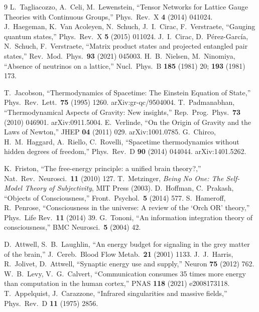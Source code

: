\documentclass[12pt,a4paper,twoside]{article}
\theoremstyle{plain}
\theoremstyle{definition}
\theoremstyle{remark}
\begin{document}
\begin{thebibliography}{9}
L.~Tagliacozzo, A.~Celi, M.~Lewenstein, ``Tensor Networks for Lattice Gauge Theories with Continuous Groups,'' Phys.\ Rev.\ X \textbf{4} (2014) 041024.
J.~Haegeman, K.~Van Acoleyen, N.~Schuch, J.~I.~Cirac, F.~Verstraete, ``Gauging quantum states,'' Phys.\ Rev.\ X \textbf{5} (2015) 011024.
J.~I.~Cirac, D.~P\'erez-Garc\'ia, N.~Schuch, F.~Verstraete, ``Matrix product states and projected entangled pair states,'' Rev.\ Mod.\ Phys.\ \textbf{93} (2021) 045003.
H.~B.~Nielsen, M.~Ninomiya, ``Absence of neutrinos on a lattice,'' Nucl.\ Phys.\ B \textbf{185} (1981) 20; \textbf{193} (1981) 173.

T.~Jacobson, ``Thermodynamics of Spacetime: The Einstein Equation of State,'' Phys.\ Rev.\ Lett.\ \textbf{75} (1995) 1260. arXiv:gr-qc/9504004.
T.~Padmanabhan, ``Thermodynamical Aspects of Gravity: New insights,'' Rep.\ Prog.\ Phys.\ \textbf{73} (2010) 046901. arXiv:0911.5004.
E.~Verlinde, ``On the Origin of Gravity and the Laws of Newton,'' JHEP \textbf{04} (2011) 029. arXiv:1001.0785.
G.~Chirco, H.~M.~Haggard, A.~Riello, C.~Rovelli, ``Spacetime thermodynamics without hidden degrees of freedom,'' Phys.\ Rev.\ D \textbf{90} (2014) 044044. arXiv:1401.5262.

K.~Friston, ``The free-energy principle: a unified brain theory?,'' Nat.\ Rev.\ Neurosci.\ \textbf{11} (2010) 127.
T.~Metzinger, \textit{Being No One: The Self-Model Theory of Subjectivity}, MIT Press (2003).
D.~Hoffman, C.~Prakash, ``Objects of Consciousness,'' Front.\ Psychol.\ \textbf{5} (2014) 577.
S.~Hameroff, R.~Penrose, ``Consciousness in the universe: A review of the `Orch OR' theory,'' Phys.\ Life Rev.\ \textbf{11} (2014) 39.
G.~Tononi, ``An information integration theory of consciousness,'' BMC Neurosci.\ \textbf{5} (2004) 42.

D.~Attwell, S.~B.~Laughlin, ``An energy budget for signaling in the grey matter of the brain,'' J.\ Cereb.\ Blood Flow Metab.\ \textbf{21} (2001) 1133.
J.~J.~Harris, R.~Jolivet, D.~Attwell, ``Synaptic energy use and supply,'' Neuron \textbf{75} (2012) 762.
W.~B.~Levy, V.~G.~Calvert, ``Communication consumes 35 times more energy than computation in the human cortex,'' PNAS \textbf{118} (2021) e2008173118.
T.~Appelquist, J.~Carazzone, ``Infrared singularities and massive fields,'' Phys.\ Rev.\ D \textbf{11} (1975) 2856.


\end{thebibliography}
\end{document}
